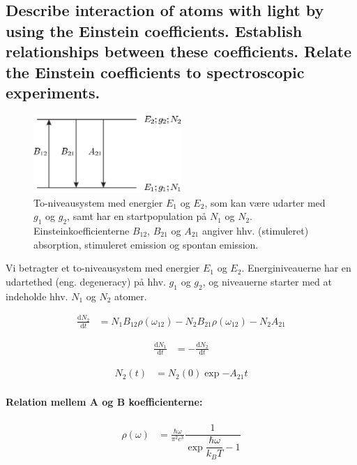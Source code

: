\subsection{Describe interaction of atoms with light by using the Einstein coefficients. Establish relationships between these coefficients. Relate the Einstein coefficients to spectroscopic experiments.}


\begin{figure}[!h]
    \centering
    \includegraphics[width=0.5\textwidth]{Q02/images/TwoLevelSystem2.PNG}
    \caption{To-niveausystem med energier $E_1$ og $E_2$, som kan være udarter med $g_1$ og $g_2$, samt har en startpopulation på $N_1$ og $N_2$. Einsteinkoefficienterne $B_{12}$, $B_{21}$ og $A_{21}$ angiver hhv. (stimuleret) absorption, stimuleret emission og spontan emission.}
    \label{fig:Q02_TwoLevelSystem}
\end{figure}

Vi betragter et to-niveausystem med energier $E_1$ og $E_2$. Energiniveauerne har en udartethed (eng. degeneracy) på hhv. $g_1$ og $g_2$, og niveauerne starter med at indeholde hhv. $N_1$ og $N_2$ atomer.


\begin{align}
    \frac{\text{d}N_2}{\text{d}t} &= N_1 B_{12} \rho(\omega_{12}) - N_2 B_{21} \rho(\omega_{12}) - N_2 A_{21}
\end{align}

\begin{align}
    \frac{\text{d}N_1}{\text{d}t} &= - \frac{\text{d}N_2}{\text{d}t}
\end{align}

\begin{align}
    N_2(t) &= N_2(0)\exp{-A_{21}t}
\end{align}


\paragraph{Relation mellem A og B koefficienterne:}

\begin{align}
    \rho(\omega) &= \frac{\hbar\omega}{\pi^2c^3} \dfrac{1}{\exp{\dfrac{\hbar\omega}{k_B T}} - 1}
\end{align}

